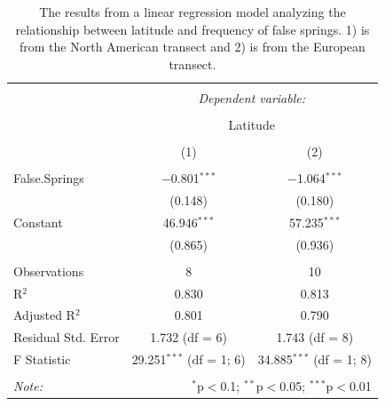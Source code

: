 \documentclass{article}\usepackage[]{graphicx}\usepackage[]{color}
\begin{document}
\begin{table}[!htbp] \centering 
  \caption{The results from a linear regression model analyzing the relationship between latitude and frequency of false springs. 1) is from the North American transect and 2) is from the European transect.} 
  \label{} 
\begin{tabular}{@{\extracolsep{5pt}}lcc} 
\\[-1.8ex]\hline 
\hline \\[-1.8ex] 
 & \multicolumn{2}{c}{\textit{Dependent variable:}} \\ 
\cline{2-3} 
\\[-1.8ex] & \multicolumn{2}{c}{Latitude} \\ 
\\[-1.8ex] & (1) & (2)\\ 
\hline \\[-1.8ex] 
 False.Springs & $-$0.801$^{***}$ & $-$1.064$^{***}$ \\ 
  & (0.148) & (0.180) \\ 
  Constant & 46.946$^{***}$ & 57.235$^{***}$ \\ 
  & (0.865) & (0.936) \\ 
 \hline \\[-1.8ex] 
Observations & 8 & 10 \\ 
R$^{2}$ & 0.830 & 0.813 \\ 
Adjusted R$^{2}$ & 0.801 & 0.790 \\ 
Residual Std. Error & 1.732 (df = 6) & 1.743 (df = 8) \\ 
F Statistic & 29.251$^{***}$ (df = 1; 6) & 34.885$^{***}$ (df = 1; 8) \\ 
\hline 
\hline \\[-1.8ex] 
\textit{Note:}  & \multicolumn{2}{r}{$^{*}$p$<$0.1; $^{**}$p$<$0.05; $^{***}$p$<$0.01} \\ 
\end{tabular} 
\end{table} 



\end{document}
